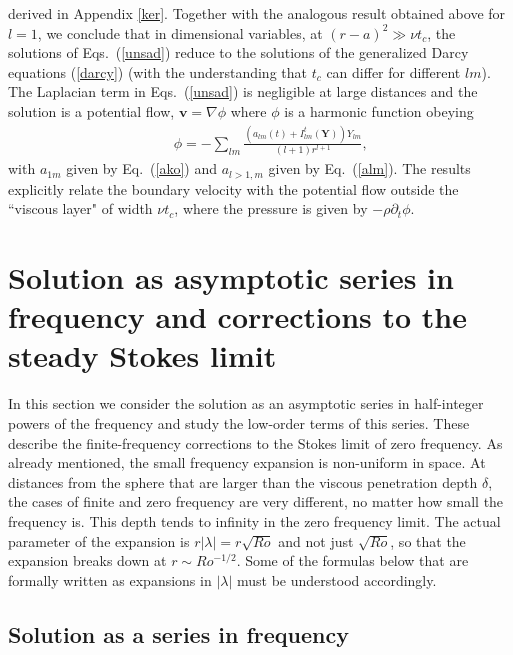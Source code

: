\documentclass[aps,prx,twocolumn,amsmath,amssymb,amsfonts]{revtex4-2}
\begin{document}
derived in Appendix \ref{ker}. Together with the analogous result obtained above for $l=1$, we conclude that in dimensional variables, at $(r-a)^2\gg \nu t_c$, the solutions of Eqs.~(\ref{unsad}) reduce to the solutions of the generalized Darcy equations (\ref{darcy}) (with the understanding that $t_c$ can differ for different $lm$). The Laplacian term in Eqs.~(\ref{unsad}) is negligible at large distances and the solution is a potential flow, $\bm v=\nabla \phi$ where $\phi$ is a harmonic function obeying
\begin{eqnarray}&&\!\!\!\!\!\!\!\!\!\!\!\!\!
\phi=-\sum_{lm}\frac{\left(a_{lm}(t)+I^{t}_{lm}(\bm Y)\right)Y_{lm}}{(l+1)r^{l+1}}, \label{phil}
\end{eqnarray}
with $a_{1m}$ given by Eq.~(\ref{ako}) and $a_{l>1, m}$ given by Eq.~(\ref{alm}). The results explicitly relate the boundary velocity with the potential flow outside the ``viscous layer" of width $\nu t_c$, where the pressure is given by $-\rho\partial_t\phi$.


\section{Solution as asymptotic series in frequency and corrections to the steady Stokes limit}\label{freq}

In this section we consider the solution as an asymptotic series in half-integer powers of the frequency and study the low-order terms of this series. These describe the finite-frequency corrections to the Stokes limit of zero frequency. As already mentioned, the small frequency expansion is non-uniform in space. At distances from the sphere that are larger than the viscous penetration depth $\delta$, the cases of finite and zero frequency are very different, no matter how small the frequency is. This depth tends to infinity in the zero frequency limit. The actual parameter of the expansion is $r|\lambda| =r\sqrt{Ro} $ and not just $\sqrt{Ro}$, so that the expansion breaks down at $r\sim Ro^{-1/2}$. Some of the formulas below that are formally written as expansions in $|\lambda|$ must be understood accordingly.

\subsection{Solution as a series in frequency}\label{frequencyindependent}
\end{document}
